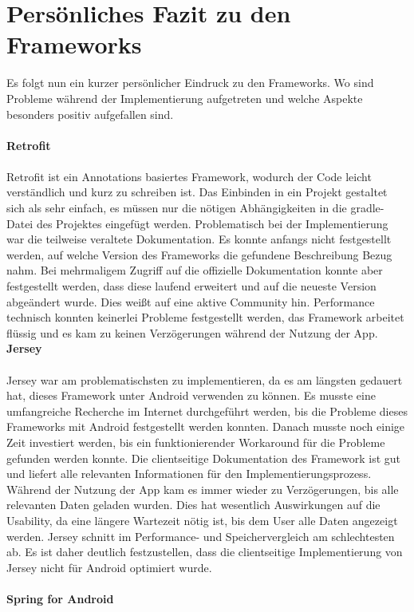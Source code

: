 \section{Persönliches Fazit zu den Frameworks}
Es folgt nun ein kurzer persönlicher Eindruck zu den Frameworks. Wo sind Probleme während der Implementierung aufgetreten und welche Aspekte besonders positiv aufgefallen sind.
\\\\
{\large \textbf{Retrofit}}\\\\
Retrofit ist ein Annotations basiertes Framework, wodurch der Code leicht verständlich und kurz zu schreiben ist. Das Einbinden in ein Projekt gestaltet sich als sehr einfach, es müssen nur die nötigen Abhängigkeiten in die gradle-Datei des Projektes eingefügt werden. Problematisch bei der Implementierung war die teilweise veraltete Dokumentation. Es konnte anfangs nicht festgestellt werden, auf welche Version des Frameworks die gefundene Beschreibung Bezug nahm. Bei mehrmaligem Zugriff auf die offizielle Dokumentation konnte aber festgestellt werden, dass diese laufend erweitert und auf die neueste Version abgeändert wurde. Dies weißt auf eine aktive Community hin. Performance technisch konnten keinerlei Probleme festgestellt werden, das Framework arbeitet flüssig und es kam zu keinen Verzögerungen während der Nutzung der App.
\newpage
{\large \textbf{Jersey}}\\\\
Jersey war am problematischsten zu implementieren, da es am längsten gedauert hat, dieses Framework unter Android verwenden zu können. Es musste eine umfangreiche Recherche im Internet durchgeführt werden, bis die Probleme dieses Frameworks mit Android festgestellt werden konnten. Danach musste noch einige Zeit investiert werden, bis ein funktionierender Workaround für die Probleme gefunden werden konnte. Die clientseitige Dokumentation des Framework ist gut und liefert alle relevanten Informationen für den Implementierungsprozess. Während der Nutzung der App kam es immer wieder zu Verzögerungen, bis alle relevanten Daten geladen wurden. Dies hat wesentlich Auswirkungen auf die Usability, da eine längere Wartezeit nötig ist, bis dem User alle Daten angezeigt werden. Jersey schnitt im Performance- und Speichervergleich am schlechtesten ab. Es ist daher deutlich festzustellen, dass die clientseitige Implementierung von Jersey nicht für Android optimiert wurde.
\\\\
{\large \textbf{Spring for Android}}\\\\
